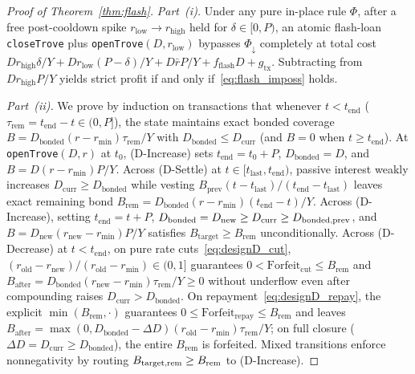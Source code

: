 \begin{proof}[Proof of Theorem~\ref{thm:flash}]
\emph{Part~(i).} Under any pure in-place rule $\Phi$, after a free post-cooldown spike $r_{\mathrm{low}} \to r_{\mathrm{high}}$ held for $\delta \in [0, P)$, an atomic flash-loan \texttt{closeTrove} plus \texttt{openTrove}$(D, r_{\mathrm{low}})$ bypasses $\Phi_\downarrow$ completely at total cost $D r_{\mathrm{high}}\delta/Y + D r_{\mathrm{low}}(P - \delta)/Y + D\bar{r}P/Y + f_{\mathrm{flash}} D + g_{\mathrm{tx}}$. Subtracting from $D r_{\mathrm{high}}P/Y$ yields strict profit if and only if~\eqref{eq:flash_imposs} holds.

\emph{Part~(ii).} We prove by induction on transactions that whenever $t < t_{\mathrm{end}}$ ($\tau_{\mathrm{rem}} = t_{\mathrm{end}} - t \in (0, P]$), the state maintains exact bonded coverage $B = D_{\mathrm{bonded}}(r - r_{\min})\tau_{\mathrm{rem}}/Y$ with $D_{\mathrm{bonded}} \le D_{\mathrm{curr}}$ (and $B = 0$ when $t \ge t_{\mathrm{end}}$). At \texttt{openTrove}$(D, r)$ at $t_0$, \textup{(D-Increase)} sets $t_{\mathrm{end}} = t_0 + P$, $D_{\mathrm{bonded}} = D$, and $B = D(r - r_{\min})P/Y$. Across \textup{(D-Settle)} at $t \in [t_{\mathrm{last}}, t_{\mathrm{end}})$, passive interest weakly increases $D_{\mathrm{curr}} \ge D_{\mathrm{bonded}}$ while vesting $B_{\mathrm{prev}}(t - t_{\mathrm{last}})/(t_{\mathrm{end}} - t_{\mathrm{last}})$ leaves exact remaining bond $B_{\mathrm{rem}} = D_{\mathrm{bonded}}(r - r_{\min})(t_{\mathrm{end}} - t)/Y$. Across \textup{(D-Increase)}, setting $t_{\mathrm{end}} = t + P$, $D_{\mathrm{bonded}} = D_{\mathrm{new}} \ge D_{\mathrm{curr}} \ge D_{\textup{bonded,prev}}$, and $B = D_{\mathrm{new}}(r_{\mathrm{new}} - r_{\min})P/Y$ satisfies $B_{\mathrm{target}} \ge B_{\mathrm{rem}}$ unconditionally. Across \textup{(D-Decrease)} at $t < t_{\mathrm{end}}$, on pure rate cuts~\eqref{eq:designD_cut}, $(r_{\mathrm{old}} - r_{\mathrm{new}})/(r_{\mathrm{old}} - r_{\min}) \in (0, 1]$ guarantees $0 < \mathrm{Forfeit}_{\mathrm{cut}} \le B_{\mathrm{rem}}$ and $B_{\mathrm{after}} = D_{\mathrm{bonded}}(r_{\mathrm{new}} - r_{\min})\tau_{\mathrm{rem}}/Y \ge 0$ without underflow even after compounding raises $D_{\mathrm{curr}} > D_{\mathrm{bonded}}$. On repayment~\eqref{eq:designD_repay}, the explicit $\min(B_{\mathrm{rem}}, \cdot)$ guarantees $0 \le \mathrm{Forfeit}_{\mathrm{repay}} \le B_{\mathrm{rem}}$ and leaves $B_{\mathrm{after}} = \max(0, D_{\mathrm{bonded}} - \Delta D)(r_{\mathrm{old}} - r_{\min})\tau_{\mathrm{rem}}/Y$; on full closure ($\Delta D = D_{\mathrm{curr}} \ge D_{\mathrm{bonded}}$), the entire $B_{\mathrm{rem}}$ is forfeited. Mixed transitions enforce nonnegativity by routing $B_{\textup{target,rem}} \ge B_{\mathrm{rem}}$ to \textup{(D-Increase)}.


\end{proof}
